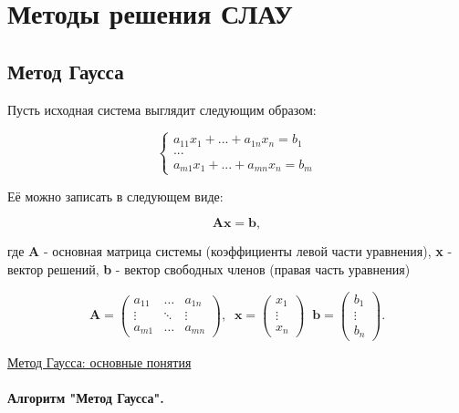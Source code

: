 \documentclass[12pt]{article}
\begin{document}
\section{Методы решения СЛАУ}

\subsection{Метод Гаусса}

Пусть исходная система выглядит следующим образом:

\begin{equation}
	\begin{cases}
		a_{11}x_1 + ... + a_{1n}x_n = b_1\\
		...\\
		a_{m1}x_1 + ... + a_{mn}x_n = b_m
	\end{cases}
\end{equation}

Её можно записать в следующем виде:

\begin{equation}
	\mathbf{Ax = b},
\end{equation}

где
\textbf{A} - основная матрица системы (коэффициенты левой части уравнения), \textbf{x} - вектор решений,
\textbf{b} - вектор свободных членов (правая часть уравнения)

\begin{equation}
	\mathbf{A} = 
	\begin{pmatrix}
		a_{11} & \dots & a_{1n} \\
		\vdots & \ddots & \vdots \\
		a_{m1} & \dots & a_{mn}
	\end{pmatrix}
	,
	\;\;
	\mathbf{x} = 
	\begin{pmatrix}
		x_1 \\
		\vdots \\
		x_n
	\end{pmatrix}
	\;\;
	\mathbf{b} = 
	\begin{pmatrix}
		b_1 \\
		\vdots \\
		b_n
	\end{pmatrix}
	.
\end{equation}

\href{https://zaochnik.com/spravochnik/matematika/issledovanie-slau/metod-gaussa/}{Метод Гаусса: основные понятия}

\paragraph{Алгоритм "Метод Гаусса".}
\end{document}
